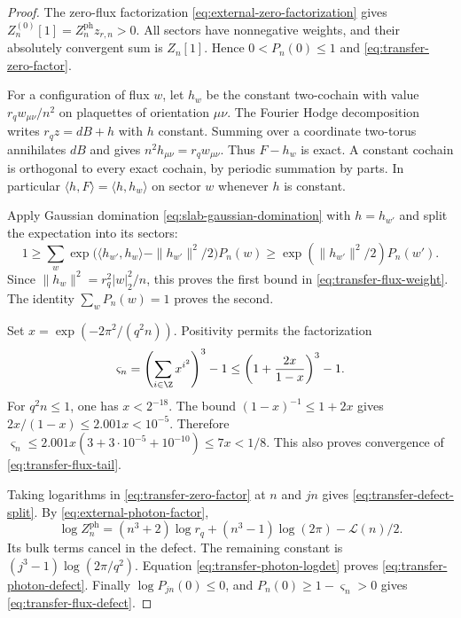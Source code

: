 \begin{proof}
The zero-flux factorization \eqref{eq:external-zero-factorization}
gives $Z_n^{(0)}[1]=Z_n^{\mathrm{ph}}z_{r,n}>0$.
All sectors have nonnegative weights, and their absolutely
convergent sum is $Z_n[1]$. Hence
$0<P_n(0)\le1$ and \eqref{eq:transfer-zero-factor}.

For a configuration of flux $w$, let $h_w$ be the
constant two-cochain with value
$r_qw_{\mu\nu}/n^2$ on plaquettes of orientation $\mu\nu$.
The Fourier Hodge decomposition writes
$r_qz=dB+h$ with $h$ constant.
Summing over a coordinate two-torus annihilates $dB$
and gives $n^2h_{\mu\nu}=r_qw_{\mu\nu}$.
Thus $F-h_w$ is exact. A constant cochain is orthogonal
to every exact cochain, by periodic summation by parts.
In particular $\langle h,F\rangle=\langle h,h_w\rangle$
on sector $w$ whenever $h$ is constant.

Apply Gaussian domination \eqref{eq:slab-gaussian-domination}
with $h=h_{w'}$ and split the expectation into its sectors:
\[
 1\ge\sum_w
 \exp\bigl(\langle h_{w'},h_w\rangle-\|h_{w'}\|^2/2\bigr)P_n(w)
 \ge \exp(\|h_{w'}\|^2/2)P_n(w').
\]
Since $\|h_w\|^2=r_q^2|w|_2^2/n$, this proves the
first bound in \eqref{eq:transfer-flux-weight}.
The identity $\sum_wP_n(w)=1$ proves the second.

Set $x=\exp(-2\pi^2/(q^2n))$. Positivity permits the
factorization
\[
 \varsigma_n=\left(\sum_{i\in\Z}x^{i^2}\right)^3-1
 \le\left(1+\frac{2x}{1-x}\right)^3-1.
\]
For $q^2n\le1$, one has $x<2^{-18}$.
The bound $(1-x)^{-1}\le1+2x$ gives
$2x/(1-x)\le2.001x<10^{-5}$. Therefore
$\varsigma_n\le2.001x(3+3\cdot10^{-5}+10^{-10})
\le7x<1/8$. This also proves convergence of
\eqref{eq:transfer-flux-tail}.

Taking logarithms in \eqref{eq:transfer-zero-factor}
at $n$ and $jn$ gives \eqref{eq:transfer-defect-split}.
By \eqref{eq:external-photon-factor},
\[
 \log Z_n^{\mathrm{ph}}
   =(n^3+2)\log r_q+(n^3-1)\log(2\pi)-\mathcal L(n)/2.
\]
Its bulk terms cancel in the defect. The remaining
constant is $(j^3-1)\log(2\pi/q^2)$.
Equation \eqref{eq:transfer-photon-logdet} proves
\eqref{eq:transfer-photon-defect}. Finally
$\log P_{jn}(0)\le0$, and
$P_n(0)\ge1-\varsigma_n>0$ gives
\eqref{eq:transfer-flux-defect}.
\end{proof}

